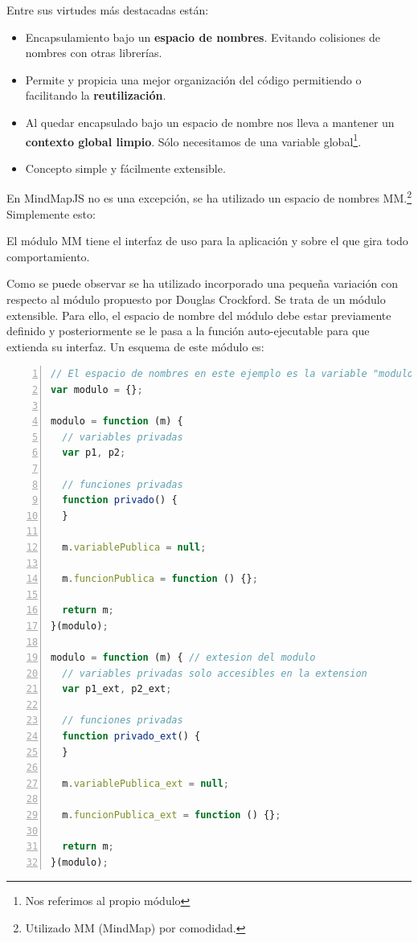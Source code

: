 Entre sus virtudes más destacadas están:
\begin{itemize}
\item Encapsulamiento bajo un \textbf{espacio de nombres}. Evitando colisiones de nombres con otras librerías.
\item Permite y propicia una mejor organización del código permitiendo o facilitando la \textbf{reutilización}.
\item Al quedar encapsulado bajo un espacio de nombre nos lleva a mantener un \textbf{contexto global limpio}. Sólo necesitamos de una variable global\footnote{Nos referimos al propio módulo}.
\item Concepto simple y fácilmente extensible.
\end{itemize}

En MindMapJS no es una excepción, se ha utilizado un espacio de nombres MM.\footnote{Utilizado MM (MindMap) por comodidad.} Simplemente esto:
\lstset{inputencoding=utf8/latin1}


El módulo MM tiene el interfaz de uso para la aplicación y sobre el que gira todo comportamiento. 




Como se puede observar se ha utilizado incorporado una pequeña variación con respecto al módulo propuesto por Douglas Crockford. Se trata de un módulo extensible. Para ello, el espacio de nombre del módulo debe estar previamente definido y posteriormente se le pasa a la función auto-ejecutable para que extienda su interfaz. Un esquema de este módulo es:

\begin{lstlisting}[language=JavaScript, numbers=left]
// El espacio de nombres en este ejemplo es la variable "modulo"
var modulo = {};

modulo = function (m) {
  // variables privadas
  var p1, p2;
 
  // funciones privadas
  function privado() {
  }
 
  m.variablePublica = null;
  
  m.funcionPublica = function () {};
 
  return m;
}(modulo);

modulo = function (m) { // extesion del modulo
  // variables privadas solo accesibles en la extension
  var p1_ext, p2_ext;
 
  // funciones privadas
  function privado_ext() {
  }
 
  m.variablePublica_ext = null;
  
  m.funcionPublica_ext = function () {};
 
  return m;
}(modulo);
\end{lstlisting}

